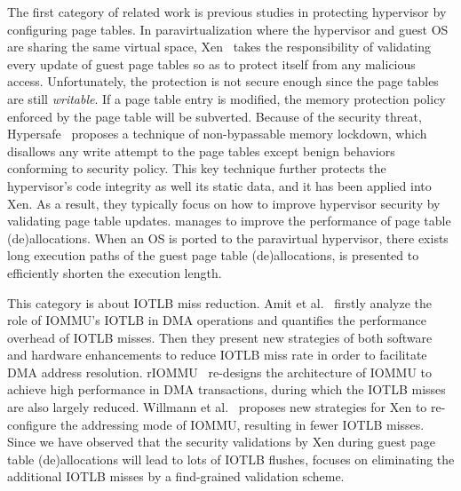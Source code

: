  The first category of related work is previous studies in protecting hypervisor by configuring page tables. In paravirtualization where the hypervisor and guest OS are sharing the same virtual space, Xen~\cite{barham2003xen} takes the responsibility of validating every update of guest page tables so as to protect itself from any malicious access. Unfortunately, the protection is not secure enough since the page tables are still \emph{writable}. If a page table entry is modified, the memory protection policy enforced by the page table will be subverted. Because of the security threat, Hypersafe~\cite{wang2010hypersafe} proposes a technique of non-bypassable memory lockdown, which disallows any write attempt to the page tables except benign behaviors conforming to security policy. This key technique further protects the hypervisor's code integrity as well its static data, and it has been applied into Xen.
As a result, they typically focus on how to improve hypervisor security by validating page table updates. \name manages to improve the performance of page table (de)allocations. When an OS is ported to the paravirtual hypervisor, there exists long execution paths of the guest page table (de)allocations, \name is presented to efficiently shorten the execution length.

 This category is about IOTLB miss reduction. Amit et al.~\cite{amit2012iommu} firstly analyze the role of IOMMU's IOTLB in DMA operations and quantifies the performance overhead of IOTLB misses. Then they present new strategies of both software and hardware enhancements to reduce IOTLB miss rate in order to facilitate DMA address resolution. rIOMMU~\cite{malka2015riommu} re-designs the architecture of IOMMU to achieve high performance in DMA transactions, during which the IOTLB misses are also largely reduced. Willmann et al.~\cite{willmann2008protection} proposes new strategies for Xen to re-configure the addressing mode of IOMMU, resulting in fewer IOTLB misses.
Since we have observed that the security validations by Xen during guest page table (de)allocations will lead to lots of IOTLB flushes, \name focuses on eliminating the additional IOTLB misses by a find-grained validation scheme.


